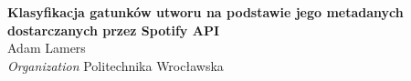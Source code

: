 \documentclass[a4paper,12pt]{article}
\renewenvironment{abstract}
 {\par\noindent\textbf{\abstractname}\ \ignorespaces \\}
 {\par\noindent\medskip}
\begin{document}
\pagestyle{fancy}
\thispagestyle{empty}
\fancyhead[L]{}
\renewcommand*{\thefootnote}{\fnsymbol{footnote}}
\begin{center}
\Large{\textbf{Klasyfikacja gatunków utworu na podstawie jego metadanych dostarczanych przez Spotify API}}
\vspace{0.4cm}
\normalsize
\\ Adam Lamers \\
\vspace{0.1cm}
\textit{Organization}
\small{Politechnika Wrocławska}
\medskip
\normalsize
\end{center}

\vspace{0.4cm}
\begin{abstract}

\end{abstract}

\medskip







\end{document}
